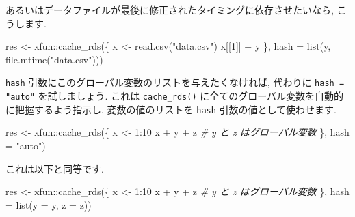 \documentclass[
  11pt,
  lualatex,ja=standard,jafont=noto]{bxjsreport}
\newenvironment{Shaded}{\begin{snugshade}}{\end{snugshade}}
\newcommand{\AttributeTok}[1]{\textcolor[rgb]{0.77,0.63,0.00}{#1}}
\newcommand{\CommentTok}[1]{\textcolor[rgb]{0.56,0.35,0.01}{\textit{#1}}}
\newcommand{\DecValTok}[1]{\textcolor[rgb]{0.00,0.00,0.81}{#1}}
\newcommand{\FunctionTok}[1]{\textcolor[rgb]{0.00,0.00,0.00}{#1}}
\newcommand{\NormalTok}[1]{#1}
\newcommand{\OtherTok}[1]{\textcolor[rgb]{0.56,0.35,0.01}{#1}}
\newcommand{\SpecialCharTok}[1]{\textcolor[rgb]{0.00,0.00,0.00}{#1}}
\newcommand{\StringTok}[1]{\textcolor[rgb]{0.31,0.60,0.02}{#1}}
\begin{document}
あるいはデータファイルが最後に修正されたタイミングに依存させたいなら, こうします.

\begin{Shaded}
\begin{Highlighting}[]
\NormalTok{res }\OtherTok{\textless{}{-}}\NormalTok{ xfun}\SpecialCharTok{::}\FunctionTok{cache\_rds}\NormalTok{(\{}
\NormalTok{  x }\OtherTok{\textless{}{-}} \FunctionTok{read.csv}\NormalTok{(}\StringTok{"data.csv"}\NormalTok{)}
\NormalTok{  x[[}\DecValTok{1}\NormalTok{]] }\SpecialCharTok{+}\NormalTok{ y}
\NormalTok{\}, }\AttributeTok{hash =} \FunctionTok{list}\NormalTok{(y, }\FunctionTok{file.mtime}\NormalTok{(}\StringTok{"data.csv"}\NormalTok{)))}
\end{Highlighting}
\end{Shaded}

\texttt{hash} 引数にこのグローバル変数のリストを与えたくなければ, 代わりに \texttt{hash = "auto"} を試しましょう. これは \texttt{cache\_rds()} に全てのグローバル変数を自動的に把握するよう指示し, 変数の値のリストを \texttt{hash} 引数の値として使わせます.

\begin{Shaded}
\begin{Highlighting}[]
\NormalTok{res }\OtherTok{\textless{}{-}}\NormalTok{ xfun}\SpecialCharTok{::}\FunctionTok{cache\_rds}\NormalTok{(\{}
\NormalTok{  x }\OtherTok{\textless{}{-}} \DecValTok{1}\SpecialCharTok{:}\DecValTok{10}
\NormalTok{  x }\SpecialCharTok{+}\NormalTok{ y }\SpecialCharTok{+}\NormalTok{ z  }\CommentTok{\# y と z はグローバル変数}
\NormalTok{\}, }\AttributeTok{hash =} \StringTok{"auto"}\NormalTok{)}
\end{Highlighting}
\end{Shaded}

これは以下と同等です.

\begin{Shaded}
\begin{Highlighting}[]
\NormalTok{res }\OtherTok{\textless{}{-}}\NormalTok{ xfun}\SpecialCharTok{::}\FunctionTok{cache\_rds}\NormalTok{(\{}
\NormalTok{  x }\OtherTok{\textless{}{-}} \DecValTok{1}\SpecialCharTok{:}\DecValTok{10}
\NormalTok{  x }\SpecialCharTok{+}\NormalTok{ y }\SpecialCharTok{+}\NormalTok{ z  }\CommentTok{\# y と z はグローバル変数}
\NormalTok{\}, }\AttributeTok{hash =} \FunctionTok{list}\NormalTok{(}\AttributeTok{y =}\NormalTok{ y, }\AttributeTok{z =}\NormalTok{ z))}
\end{Highlighting}
\end{Shaded}
\end{document}

